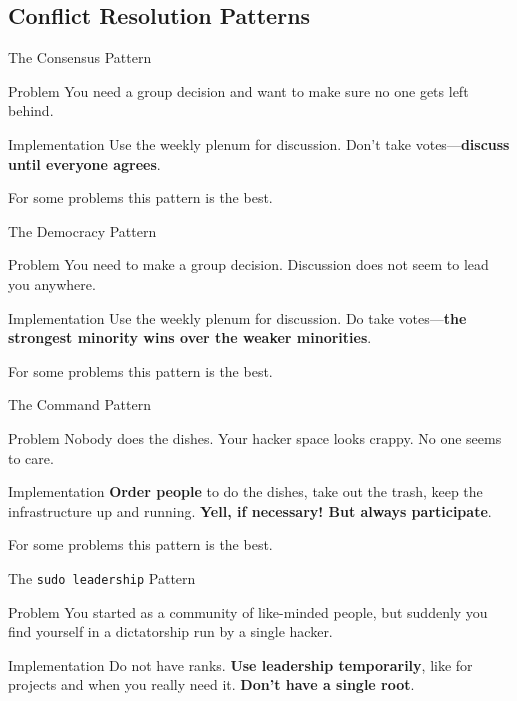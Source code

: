 \documentclass[mathserif]{beamer}
\begin{document}
\subsection{Conflict Resolution Patterns}

\begin{frame}{The Consensus Pattern}
	\begin{alertblock}{Problem}
		You need a group decision and want to make sure no one gets left behind.
	\end{alertblock}
	\pause
	\begin{exampleblock}{Implementation}
		Use the weekly plenum for discussion. Don't take votes---\textbf{discuss
		until everyone agrees}.

		For some problems this pattern is the best.
	\end{exampleblock}
\end{frame}

\begin{frame}{The Democracy Pattern}
	\begin{alertblock}{Problem}
		You need to make a group decision.  Discussion does not seem to lead you
		anywhere.
	\end{alertblock}
	\pause
	\begin{exampleblock}{Implementation}
		Use the weekly plenum for discussion.  Do take votes---\textbf{the strongest
		minority wins over the weaker minorities}.

		For some problems this pattern is the best.
	\end{exampleblock}
\end{frame}

\begin{frame}{The Command Pattern}
	\begin{alertblock}{Problem}
		Nobody does the dishes.  Your hacker space looks crappy.  No one seems to
		care.
	\end{alertblock}
	\pause
	\begin{exampleblock}{Implementation}
		\textbf{Order people} to do the dishes, take out the trash, keep the
		infrastructure up and running.  \textbf{Yell, if necessary!  But always participate}.

		For some problems this pattern is the best.
	\end{exampleblock}
\end{frame}

\begin{frame}{The \texttt{sudo leadership} Pattern}
	\begin{alertblock}{Problem}
		You started as a community of like-minded people, but suddenly you find
		yourself in a dictatorship run by a single hacker.
	\end{alertblock}
	\pause
	\begin{exampleblock}{Implementation}
		Do not have ranks.  \textbf{Use leadership temporarily}, like for projects
		and when you really need it.  \textbf{Don't have a single root}.
	\end{exampleblock}
\end{frame}
\end{document}

